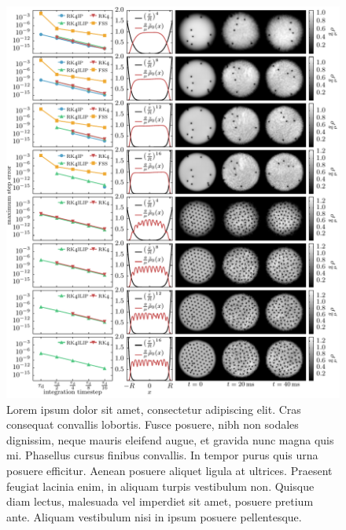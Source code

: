 \begin{figure}[ht!]
\centerfloat
\includegraphics{figures/numerics/rk4ilip_results.pdf}
\caption{Lorem ipsum dolor sit amet, consectetur adipiscing elit. Cras consequat convallis lobortis. Fusce posuere, nibh non sodales dignissim, neque mauris eleifend augue, et gravida nunc magna quis mi. Phasellus cursus finibus convallis. In tempor purus quis urna posuere efficitur. Aenean posuere aliquet ligula at ultrices. Praesent feugiat lacinia enim, in aliquam turpis vestibulum non. Quisque diam lectus, malesuada vel imperdiet sit amet, posuere pretium ante. Aliquam vestibulum nisi in ipsum posuere pellentesque. }
\label{fig:rk4ilip_results}
\end{figure}
\restoregeometry












